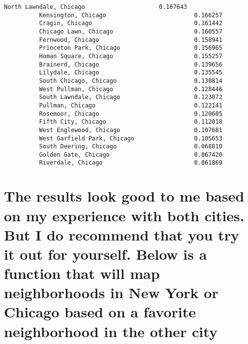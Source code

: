 \documentclass[11pt]{article}
\begin{document}
\begin{Verbatim}[commandchars=\\\{\}]
          North Lawndale, Chicago                     0.167643
          Kensington, Chicago                         0.166257
          Cragin, Chicago                             0.161442
          Chicago Lawn, Chicago                       0.160557
          Fernwood, Chicago                           0.158941
          Princeton Park, Chicago                     0.156965
          Homan Square, Chicago                       0.155257
          Brainerd, Chicago                           0.139656
          Lilydale, Chicago                           0.135545
          South Chicago, Chicago                      0.130814
          West Pullman, Chicago                       0.128446
          South Lawndale, Chicago                     0.123072
          Pullman, Chicago                            0.122141
          Rosemoor, Chicago                           0.120605
          Fifth City, Chicago                         0.112018
          West Englewood, Chicago                     0.107681
          West Garfield Park, Chicago                 0.105653
          South Deering, Chicago                      0.068810
          Golden Gate, Chicago                        0.067420
          Riverdale, Chicago                          0.061869
\end{Verbatim}
            
    \section{The results look good to me based on my experience with both
cities. But I do recommend that you try it out for yourself. Below is a
function that will map neighborhoods in New York or Chicago based on a
favorite neighborhood in the other
city}\label{the-results-look-good-to-me-based-on-my-experience-with-both-cities.-but-i-do-recommend-that-you-try-it-out-for-yourself.-below-is-a-function-that-will-map-neighborhoods-in-new-york-or-chicago-based-on-a-favorite-neighborhood-in-the-other-city}
\end{document}
